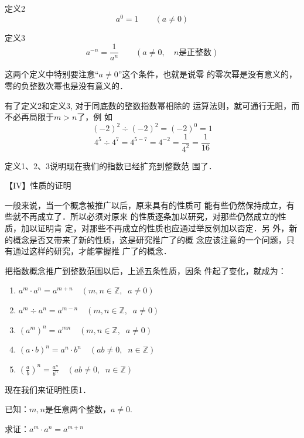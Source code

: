 \begin{blk}{定义2}
    \[a^0=1\qquad  (a\ne 0)\]
\end{blk}

\begin{blk}{定义3}
    \[a^{-n}=\frac{1}{a^n} \qquad  (a\ne 0, \quad n\text{是正整数})\]
\end{blk}

这两个定义中特别要注意“$a\ne 0$”这个条件，也就是说零
的零次幂是没有意义的，零的负整数次幂也是没有意义的．

有了定义2和定义3, 对于同底数的整数指数幂相除的
运算法则，就可通行无阻，而不必再局限于$m>n$了，例
如
\[(-2)^2\div (-2)^2=(-2)^0=1\]
\[4^5\div 4^7=4^{5-7}=4^{-2}=\frac{1}{4^2}=\frac{1}{16}\]

定义1、2、3说明现在我们的指数已经扩充到整数范
围了．

【IV】性质的证明

一般来说，当一个概念被推广以后，原来具有的性质可
能有些仍然保持成立，有些就不再成立了．所以必须对原来
的性质逐条加以研究，对那些仍然成立的性质，加以证明肯
定，对那些不再成立的性质也应通过举反例加以否定．另
外，新的概念是否又带来了新的性质，这是研究推广了的概
念应该注意的一个问题，只有通过这样的研究，才能掌握推
广了的概念．

把指数概念推广到整数范围以后，上述五条性质，因条
件起了变化，就成为：

\begin{blk}{}
\begin{enumerate}
    \item $a^m\cdot a^n=a^{m+n}\quad (m,n\in\mathbb{Z},\;\; a\ne 0)$
    \item $a^m\div a^n=a^{m-n}\quad (m,n\in\mathbb{Z},\;\; a\ne 0)$
    \item $(a^m)^n=a^{mn}\quad (m,n\in\mathbb{Z},\;\; a\ne 0)$
    \item $(a\cdot b)^n=a^{n}\cdot b^n\quad (ab\ne 0,\;\; n\in\mathbb{Z})$
    \item $\left(\frac{a}{b}\right)^n=\frac{a^n}{b^n}\quad (ab\ne 0,\;\; n\in\mathbb{Z})$
\end{enumerate}    
\end{blk}

现在我们来证明性质1．

已知：$m,n$是任意两个整数，$a\ne 0$.

求证：$a^m\cdot a^n=a^{m+n}$

